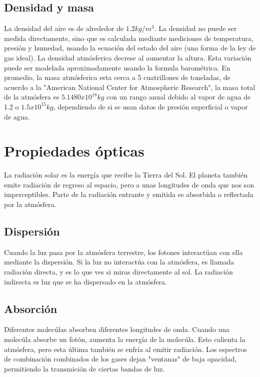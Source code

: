 \documentclass{article}
\begin{document}
\subsection {Densidad y masa}
La densidad del aire es de alrededor de $1.2kg/m^3$. La densidad no puede ser medida directamente, sino que es calculada mediante mediciones de temperatura, presión y humedad, usando la ecuación del estado del aire (una forma de la ley de gas ideal). La densidad atmósferica decrese al aumentar la altura. Esta variación puede ser modelada aproximadamente usando la formula barométrica.
En promedio, la masa atmósferica esta cerca a 5 cuatrillones de toneladas, de acuerdo a la "American National Center for Atmospheric Research", la masa total de la atmósfera es $5.1480x10^18kg$ con un rango anual debido al vapor de agua de 1.2 o $1.5x10^15kg$, dependiendo de si se usan datos de presión superficial o vapor de agua.

\section {Propiedades ópticas}
La radiación solar es la energía que recibe la Tierra del Sol. El planeta también emite radiación de regreso al espacio, pero a unas longitudes de onda que nos son imperceptibles. Parte de la radiación entrante y emitida es absorbida o reflectada por la atmósfera.

\subsection {Dispersión}
Cuando la luz pasa por la atmósfera terrestre, los fotones interactúan con ella mediante la dispersión. Si la luz no interactúa con la atmósfera, es llamada radiación directa, y es lo que ves si miras directamente al sol. La radiación indirecta es luz que se ha dispersado en la atmósfera.

\subsection {Absorción}
Diferentes molecúlas absorben diferentes longitudes de onda. Cuando una molecúla absorbe un fotón, aumenta la energía de la molecúla. Esto calienta la atmósfera, pero esta última también se enfría al emitir radiación.
Los espectros de combinación combinados de los gases dejan "ventanas" de baja opacidad, permitiendo la transmición de ciertas bandas de luz.
\end{document}
